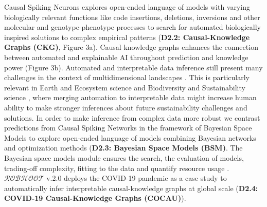 \documentclass[11pt, a4paper]{article} %
\begin{document}
   Causal Spiking Neurons explores open-ended language of models with
   varying biologically relevant functions like code insertions,
   deletions, inversions and other molecular and genotype-phenotype
   processes to search for automated biologically inspired solutions
   to complex empirical patterns ({\bf D2.2: Causal-Knowledge Graphs
     (CKG)}, Figure 3a). Causal knowledge graphs enhances the
   connection between automated and explainable AI throughout
   prediction and knowledge power (Figure 3b). Automated and
   interpretable data inference still present many challenges in the
   context of multidimensional landscapes
   \citep{OHare2015,Cranmer2019}. This is particularly relevant in
   Earth and Ecosystem science and Biodiversity and Sustainability
   science \citep{Reichstein}, where merging automation to
   interpretable data might increase human ability to make stronger
   inferences about future sustainability challenges and solutions. In
   order to make inference from complex data more robust we contrast
   predictions from Causal Spiking Networks in the framework of
   Bayesian Space Models to explore open-ended language of models
   combining Bayesian networks and optimization methods ({\bf D2.3:
     Bayesian Space Models (BSM)}. The Bayesian space models module
   ensures the search, the evaluation of models, trading-off
   complexity, fitting to the data and quantify resource usage
   \citep{Guimera2020,Steinruecken}. $\mathcal{ROBHOOT}$ v.2.0 deploys
   the COVID-19 pandemic as a case study to automatically infer
   interpretable causal-knowledge graphs at global scale ({\bf D2.4:
     COVID-19 Causal-Knowledge Graphs (COCAU)}).
\end{document}
